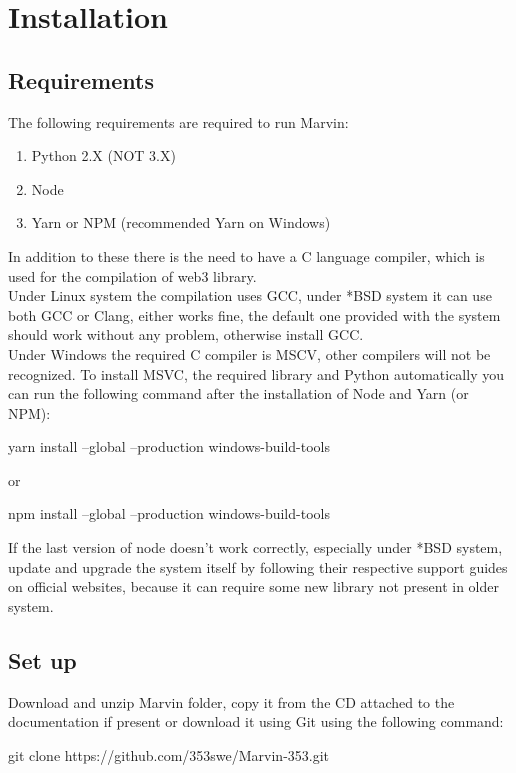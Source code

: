 \documentclass[ManualeSviluppatore.tex]{subfiles}
\begin{document}
\chapter{Installation}
\section{Requirements}
The following requirements are required to run Marvin:
\begin{enumerate}
	\item Python 2.X (NOT 3.X)
	\item Node
	\item Yarn or NPM (recommended Yarn on Windows)
\end{enumerate}
In addition to these there is the need to have a C language compiler, which is used for the compilation of web3 library.\\

Under Linux system the compilation uses GCC, under *BSD system it can use both GCC or Clang, 	
either works fine, the default one provided with the system should work without any problem, otherwise install GCC. \\

Under Windows the required C compiler is MSCV, other compilers will not be recognized. To install MSVC, the required library and Python automatically you can run the following command after the installation of Node and Yarn (or NPM): \\
\begin{ttfamily}
yarn install --global --production windows-build-tools \\
\end{ttfamily}
or \\
\begin{ttfamily}
npm install --global --production windows-build-tools \\
\end{ttfamily}

If the last version of node doesn't work correctly, especially under *BSD system, update and upgrade the system itself by following their respective support guides on official websites, because it can require some new library not present in older system.

\section{Set up}
Download and unzip Marvin folder, copy it from the CD attached to the documentation if present or download it using Git using the following command: \\
\begin{ttfamily}
	git clone https://github.com/353swe/Marvin-353.git \\
\end{ttfamily}
\end{document}

